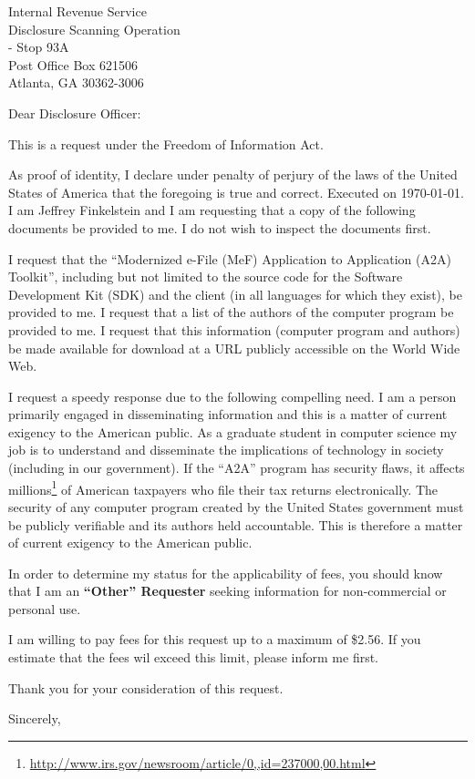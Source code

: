 \documentclass{letter}
\date{\today}
\newcommand{\usd}[1]{\$#1}
\begin{document}
\begin{letter}{Internal Revenue Service \\ Disclosure Scanning Operation \\ - Stop 93A \\ Post Office Box 621506 \\ Atlanta, GA 30362-3006}
  \opening{Dear Disclosure Officer:}
  This is a request under the Freedom of Information Act.

  As proof of identity, I declare under penalty of perjury of the laws of the United States of America that the foregoing is true and correct.
  Executed on \today.
  I am Jeffrey Finkelstein and I am requesting that a copy of the following documents be provided to me.
  I do not wish to inspect the documents first.

  I request that the ``Modernized e-File (MeF) Application to Application (A2A) Toolkit'', including but not limited to the source code for the Software Development Kit (SDK) and the client (in all languages for which they exist), be provided to me.
  I request that a list of the authors of the computer program be provided to me.
  I request that this information (computer program and authors) be made available for download at a URL publicly accessible on the World Wide Web.

  I request a speedy response due to the following compelling need.
  I am a person primarily engaged in disseminating information and this is a matter of current exigency to the American public.
  As a graduate student in computer science my job is to understand and disseminate the implications of technology in society (including in our government).
  If the ``A2A'' program has security flaws, it affects millions\footnote{\url{http://www.irs.gov/newsroom/article/0,,id=237000,00.html}} of American taxpayers who file their tax returns electronically.
  The security of any computer program created by the United States government must be publicly verifiable and its authors held accountable.
  This is therefore a matter of current exigency to the American public.

  In order to determine my status for the applicability of fees, you should know that I am an \textbf{``Other'' Requester} seeking information for non-commercial or personal use.

  I am willing to pay fees for this request up to a maximum of \usd{2.56}.
  If you estimate that the fees wil exceed this limit, please inform me first.

  Thank you for your consideration of this request.

  \closing{Sincerely,}
\end{letter}
\end{document}
